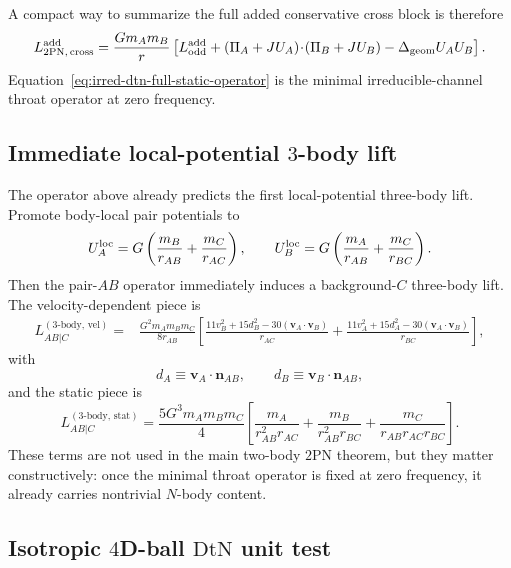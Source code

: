 \documentclass[11pt]{article}
\newcommand{\TwoPN}{\mathrm{2PN}}
\newcommand{\DtN}{\mathrm{DtN}}
\begin{document}
A compact way to summarize the full added conservative cross block is therefore
\begin{equation}
L^{\rm add}_{2\mathrm{PN},\,\mathrm{cross}}
=
\frac{Gm_A m_B}{r}
\left[
L^{\rm add}_{\rm odd}
+(\Pi_A+JU_A)\!\cdot\!(\Pi_B+JU_B)
-\Delta_{\rm geom}U_AU_B
\right].
\label{eq:irred-dtn-full-static-operator}
\end{equation}
Equation~\eqref{eq:irred-dtn-full-static-operator} is the minimal irreducible-channel
throat operator at zero frequency.

\subsection{Immediate local-potential \texorpdfstring{$3$}{3}-body lift}
\label{app:irred-dtn-3body}

The operator above already predicts the first local-potential three-body lift.  Promote
body-local pair potentials to
\begin{equation}
U_A^{\rm loc}=G\left(\frac{m_B}{r_{AB}}+\frac{m_C}{r_{AC}}\right),
\qquad
U_B^{\rm loc}=G\left(\frac{m_A}{r_{AB}}+\frac{m_C}{r_{BC}}\right).
\label{eq:irred-dtn-local-potentials-3body}
\end{equation}
Then the pair-\(AB\) operator immediately induces a background-\(C\) three-body lift.
The velocity-dependent piece is
\begin{align}
L^{(3\text{-body, vel})}_{AB|C}
={}&
\frac{G^2m_A m_B m_C}{8r_{AB}}
\left[
\frac{11v_B^2+15d_B^2-30(\mathbf v_A\!\cdot\!\mathbf v_B)}{r_{AC}}
+
\frac{11v_A^2+15d_A^2-30(\mathbf v_A\!\cdot\!\mathbf v_B)}{r_{BC}}
\right],
\label{eq:irred-dtn-3body-vel}
\end{align}
with
\begin{equation}
d_A\equiv \mathbf v_A\!\cdot\!\mathbf n_{AB},
\qquad
d_B\equiv \mathbf v_B\!\cdot\!\mathbf n_{AB},
\label{eq:irred-dtn-dA-dB-3body}
\end{equation}
and the static piece is
\begin{equation}
L^{(3\text{-body, stat})}_{AB|C}
=
\frac{5G^3m_A m_B m_C}{4}
\left[
\frac{m_A}{r_{AB}^2r_{AC}}
+
\frac{m_B}{r_{AB}^2r_{BC}}
+
\frac{m_C}{r_{AB}r_{AC}r_{BC}}
\right].
\label{eq:irred-dtn-3body-static}
\end{equation}
These terms are not used in the main two-body \(\TwoPN\) theorem, but they matter
constructively: once the minimal throat operator is fixed at zero frequency, it already
carries nontrivial \(N\)-body content.

\subsection{Isotropic \texorpdfstring{$4$}{4}D-ball \texorpdfstring{$\DtN$}{DtN} unit test}
\label{app:irred-dtn-ball}
\end{document}
